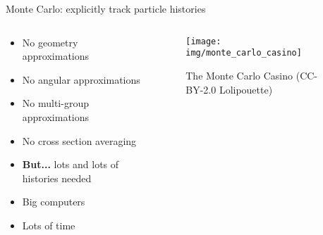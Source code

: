 \documentclass[pdf,aspectratio=169]{beamer}
\begin{document}
\begin{frame}{Monte Carlo: explicitly track particle histories}
\begin{columns}
    \begin{column}{0.5\textwidth}
        \begin{itemize}
            \item No geometry approximations
            \item No angular approximations
            \item No multi-group approximations
            \item No cross section averaging
            \item \textbf{But...} lots and lots of histories needed
            \item Big computers
            \item Lots of time
        \end{itemize}
    \end{column}
    \begin{column}{0.5\textwidth}
        \begin{figure}[ht]
        \centering
            \texttt{[image: img/monte\_carlo\_casino]}
            \caption{\small The Monte Carlo Casino (CC-BY-2.0 Lolipouette)} 
        \end{figure}
    \end{column}
\end{columns}
\end{frame}
\end{document}

